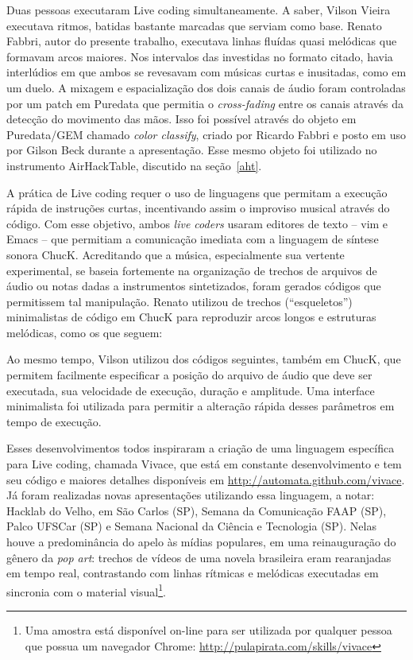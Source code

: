 Duas pessoas executaram Live coding simultaneamente. A saber, Vilson
Vieira executava ritmos, batidas bastante marcadas que serviam como
base. Renato Fabbri, autor do presente trabalho, executava linhas
fluídas quasi melódicas que formavam arcos maiores. Nos intervalos das
investidas no formato citado, havia interlúdios em que ambos se
revesavam com músicas curtas e inusitadas, como em um duelo. A mixagem
e espacialização dos dois canais de áudio foram controladas por um
patch em Puredata que permitia o \textit{cross-fading} entre os canais
através da detecção do movimento das mãos. Isso foi possível através
do objeto em Puredata/GEM chamado \emph{color classify}, criado por
Ricardo Fabbri e posto em uso por Gilson Beck durante a
apresentação. Esse mesmo objeto foi utilizado no instrumento
AirHackTable, discutido na seção~\ref{aht}.

A prática de Live coding requer o uso de linguagens que permitam a
execução rápida de instruções curtas, incentivando assim o improviso
musical através do código. Com esse objetivo, ambos \emph{live coders}
usaram editores de texto -- vim e Emacs -- que permitiam a comunicação
imediata com a linguagem de síntese sonora ChucK.  Acreditando que a
música, especialmente sua vertente experimental, se baseia fortemente
na organização de trechos de arquivos de áudio ou notas dadas a
instrumentos sintetizados, foram gerados códigos que permitissem tal
manipulação. Renato utilizou de trechos (``esqueletos'') minimalistas
de código em ChucK para reproduzir arcos longos e estruturas
melódicas, como os que seguem:


Ao mesmo tempo, Vilson utilizou dos códigos seguintes, também em
ChucK, que permitem facilmente especificar a posição do arquivo de
áudio que deve ser executada, sua velocidade de execução, duração e
amplitude. Uma interface minimalista foi utilizada para permitir a
alteração rápida desses parâmetros em tempo de execução.



Esses desenvolvimentos todos inspiraram a criação de uma linguagem
específica para Live coding, chamada Vivace, que está em constante
desenvolvimento e tem seu código e maiores detalhes disponíveis em
\url{http://automata.github.com/vivace}. Já foram realizadas novas
apresentações utilizando essa linguagem, a notar: Hacklab do Velho, em
São Carlos (SP), Semana da Comunicação FAAP (SP), Palco UFSCar (SP) e
Semana Nacional da Ciência e Tecnologia (SP). Nelas houve a
predominância do apelo às mídias populares, em uma reinauguração do
gênero da \emph{pop art}: trechos de vídeos de uma novela brasileira
eram rearanjadas em tempo real, contrastando com linhas rítmicas e
melódicas executadas em sincronia com o material visual\footnote{Uma
  amostra está disponível on-line para ser utilizada por qualquer
  pessoa que possua um navegador Chrome:
  \url{http://pulapirata.com/skills/vivace}}.

